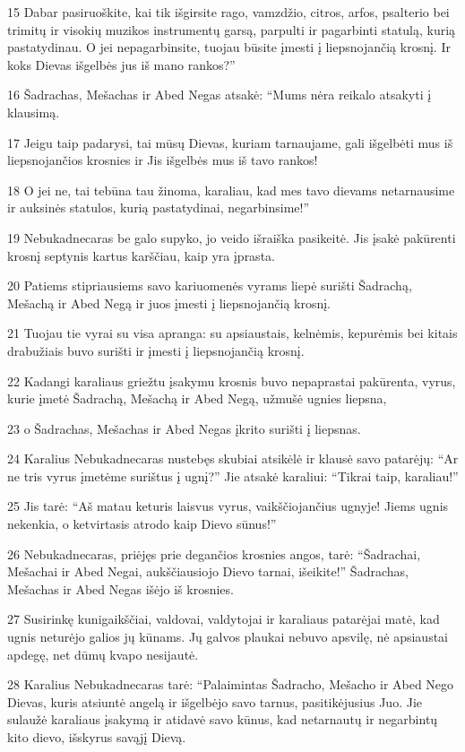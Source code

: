 \par 15 Dabar pasiruoškite, kai tik išgirsite rago, vamzdžio, citros, arfos, psalterio bei trimitų ir visokių muzikos instrumentų garsą, parpulti ir pagarbinti statulą, kurią pastatydinau. O jei nepagarbinsite, tuojau būsite įmesti į liepsnojančią krosnį. Ir koks Dievas išgelbės jus iš mano rankos?” 
\par 16 Šadrachas, Mešachas ir Abed Negas atsakė: “Mums nėra reikalo atsakyti į klausimą. 
\par 17 Jeigu taip padarysi, tai mūsų Dievas, kuriam tarnaujame, gali išgelbėti mus iš liepsnojančios krosnies ir Jis išgelbės mus iš tavo rankos! 
\par 18 O jei ne, tai tebūna tau žinoma, karaliau, kad mes tavo dievams netarnausime ir auksinės statulos, kurią pastatydinai, negarbinsime!” 
\par 19 Nebukadnecaras be galo supyko, jo veido išraiška pasikeitė. Jis įsakė pakūrenti krosnį septynis kartus karščiau, kaip yra įprasta. 
\par 20 Patiems stipriausiems savo kariuomenės vyrams liepė surišti Šadrachą, Mešachą ir Abed Negą ir juos įmesti į liepsnojančią krosnį. 
\par 21 Tuojau tie vyrai su visa apranga: su apsiaustais, kelnėmis, kepurėmis bei kitais drabužiais buvo surišti ir įmesti į liepsnojančią krosnį. 
\par 22 Kadangi karaliaus griežtu įsakymu krosnis buvo nepaprastai pakūrenta, vyrus, kurie įmetė Šadrachą, Mešachą ir Abed Negą, užmušė ugnies liepsna, 
\par 23 o Šadrachas, Mešachas ir Abed Negas įkrito surišti į liepsnas. 
\par 24 Karalius Nebukadnecaras nustebęs skubiai atsikėlė ir klausė savo patarėjų: “Ar ne tris vyrus įmetėme surištus į ugnį?” Jie atsakė karaliui: “Tikrai taip, karaliau!” 
\par 25 Jis tarė: “Aš matau keturis laisvus vyrus, vaikščiojančius ugnyje! Jiems ugnis nekenkia, o ketvirtasis atrodo kaip Dievo sūnus!” 
\par 26 Nebukadnecaras, priėjęs prie degančios krosnies angos, tarė: “Šadrachai, Mešachai ir Abed Negai, aukščiausiojo Dievo tarnai, išeikite!” Šadrachas, Mešachas ir Abed Negas išėjo iš krosnies. 
\par 27 Susirinkę kunigaikščiai, valdovai, valdytojai ir karaliaus patarėjai matė, kad ugnis neturėjo galios jų kūnams. Jų galvos plaukai nebuvo apsvilę, nė apsiaustai apdegę, net dūmų kvapo nesijautė. 
\par 28 Karalius Nebukadnecaras tarė: “Palaimintas Šadracho, Mešacho ir Abed Nego Dievas, kuris atsiuntė angelą ir išgelbėjo savo tarnus, pasitikėjusius Juo. Jie sulaužė karaliaus įsakymą ir atidavė savo kūnus, kad netarnautų ir negarbintų kito dievo, išskyrus savąjį Dievą. 
